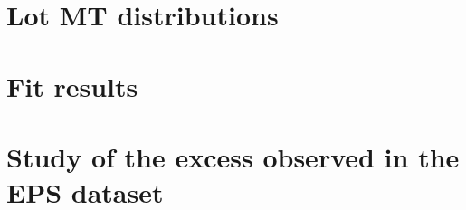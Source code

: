 \documentclass{cmspaper}
\begin{document}
\clearpage
  \section{Lot MT distributions}
     \label{app:appendix_lowmt}
     
 
\clearpage
  \section{Fit results}
     \label{app:appendix_fit}
     

\clearpage
  \section{Study of the excess observed in the EPS dataset}
     \label{app:limits_eps}
     

%  
\end{document}
